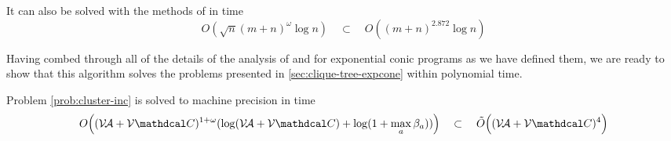 \documentclass{article}
\begin{document}
\begin{conj}
\color{red}
    It can also be solved with the methods of \textcite{skajaa2015homogeneous} in
    time
    \[ O(\sqrt{n} (m+n)^\omega \log n ) 
        \quad\subset\quad O( (m+n)^{2.872} \log n ) 
        \]
\end{conj}

Having combed through all of the details of the analysis of  \textcite{badenbroek2021algorithm} and \textcite{nesterov1996infeasible} for exponential
conic programs as we have defined them, we are ready to show that this algorithm solves the problems presented in \cref{sec:clique-tree-expcone} within polynomial time. 

\begin{lemma}\label{lem:cluster-inc-polytime}
Problem \eqref{prob:cluster-inc} is solved to machine precision in time
\[
    O\Big( (\V\!\Ar + \V\mathdcal C)^{1 + \omega} ( \log (\V\!\Ar + \V\mathdcal C) 
        + \log(1+ \max_a\beta_a)) \Big)
    \quad \subset \quad
        \tilde O\Big( (\V\!\Ar + \V\mathdcal C)^4 \Big)
\]
\end{lemma}
\end{document}
